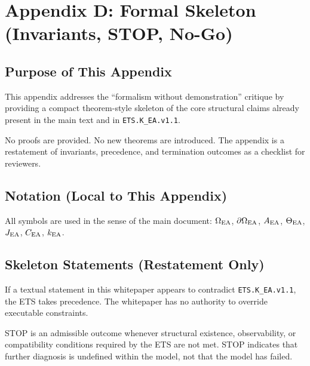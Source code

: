 
\section*{Appendix D: Formal Skeleton (Invariants, STOP, No-Go)}

\subsection*{Purpose of This Appendix}

This appendix addresses the ``formalism without demonstration'' critique
by providing a compact theorem-style skeleton of the core structural
claims already present in the main text and in \texttt{ETS.K\_EA.v1.1}.

No proofs are provided. No new theorems are introduced.
The appendix is a restatement of invariants, precedence, and
termination outcomes as a checklist for reviewers.

\subsection*{Notation (Local to This Appendix)}

All symbols are used in the sense of the main document:
$\Omega_{\mathrm{EA}}$, $\partial\Omega_{\mathrm{EA}}$, $A_{\mathrm{EA}}$, $\Theta_{\mathrm{EA}}$, $J_{\mathrm{EA}}$, $C_{\mathrm{EA}}$, $k_{\mathrm{EA}}$.

\subsection*{Skeleton Statements (Restatement Only)}

\begin{theorem}
If a textual statement in this whitepaper appears to contradict
\texttt{ETS.K\_EA.v1.1}, the ETS takes precedence. The whitepaper has no
authority to override executable constraints.
\end{theorem}

\begin{theorem}
STOP is an admissible outcome whenever structural existence,
observability, or compatibility conditions required by the ETS are not
met. STOP indicates that further diagnosis is undefined within the model,
not that the model has failed.
\end{theorem}

